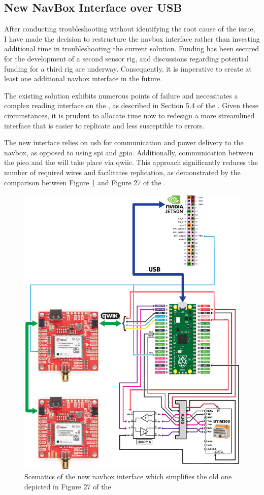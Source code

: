 \subsection{New NavBox Interface over USB}
After conducting troubleshooting without identifying the root cause of the issue, I have made the decision to restructure the \gls{navbox} interface rather than investing additional time in troubleshooting the current solution.
Funding has been secured for the development of a second sensor rig, and discussions regarding potential funding for a third rig are underway.
Consequently, it is imperative to create at least one additional \gls{navbox} interface in the future.

The existing solution exhibits numerous points of failure and necessitates a complex reading interface on the \jx, as described in Section 5.4 of the \preproject.
Given these circumstances, it is prudent to allocate time now to redesign a more streamlined interface that is easier to replicate and less susceptible to errors.

The new interface relies on \gls{usb} for communication and power delivery to the \gls{navbox}, as opposed to using \gls{spi} and \gls{gpio}.
Additionally, communication between the \gls{pico} and the  will take place via \gls{qwiic}.
This approach significantly reduces the number of required wires and facilitates replication, as demonstrated by the comparison between Figure \ref{fig:navbox_usb} and Figure 27 of the \preproject.

\begin{figure}
    \centering
    \includegraphics[width=.9\textwidth]{figures/navbox/navbox_usb.pdf}
    \caption{Scematics of the new \gls{navbox} interface which simplifies the old one depicted in Figure 27 of the \preproject}
    \label{fig:navbox_usb}
\end{figure}

